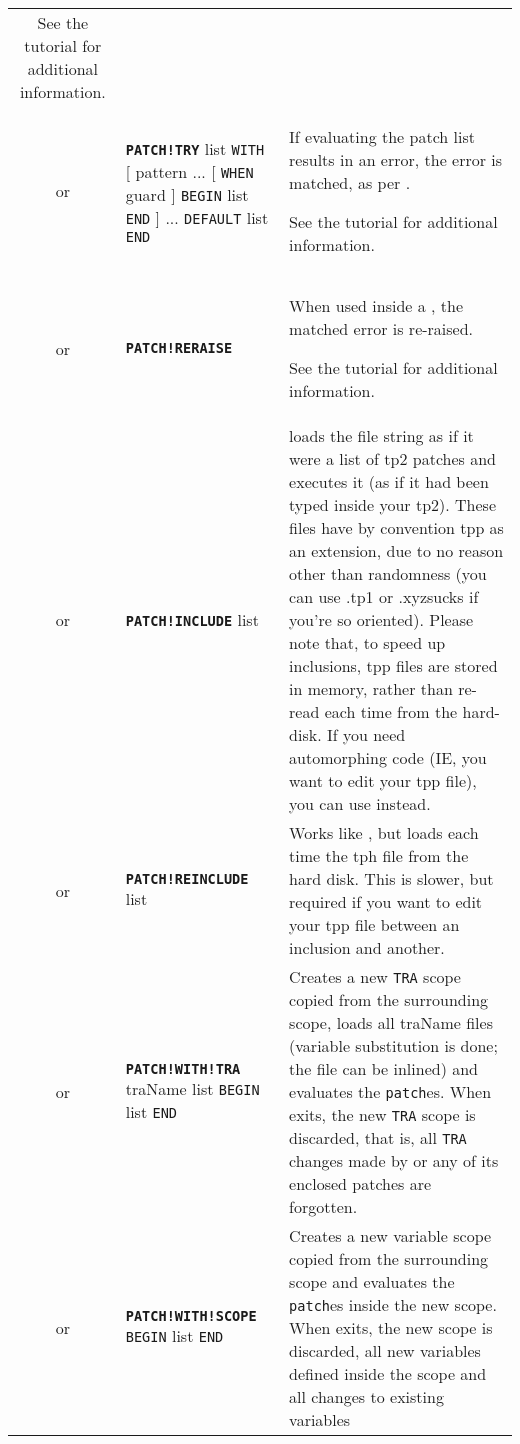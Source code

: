 \documentclass{article}
\def\ttref#1{\ahrefloc{#1}{\tt #1}}
\def\DEFINE#1{{\tt \bf #1}\label{#1}\index{#1}}
\def\t#1{{\tt #1}}
\def\Slist{{\color{red} list }}
\def\Ob{{\color{red} [ }}
\def\Oe{{\color{red} ] }}
\begin{document}
\begin{tabular}{cp{10in}|p{10in}}
    See the \ttref{MATCH and TRY} tutorial for additional information.
  \\
  or & \DEFINE{PATCH!TRY} \ttref{patch} \Slist \t{WITH} \Ob pattern\ttref{value} ...
    \Ob \t{WHEN} guard\ttref{value} \Oe
    \t{BEGIN} \ttref{patch} \Slist \t{END} \Oe
    ... \t{DEFAULT} \ttref{patch} \Slist \t{END} &
    If evaluating the patch list results in an error, the error is matched, as per \ttref{PATCH!MATCH}.

    See the \ttref{MATCH and TRY} tutorial for additional information.
  \\
  or & \DEFINE{PATCH!RERAISE} &
     When used inside a \ttref{PATCH!TRY}, the matched error is re-raised.

     See the \ttref{MATCH and TRY} tutorial for additional information.
  \\
or & \DEFINE{PATCH!INCLUDE} \t{\ttref{String}} \Slist &
    loads the file string as if it were a list of tp2 patches and executes it (as if
		it had been typed inside your tp2).
    These files have by convention tpp as an extension, due to no reason other than
    randomness (you can use .tp1 or .xyzsucks if you're so oriented).
		Please note that, to speed up inclusions, tpp files are stored in memory,
	  rather than re-read each time from the hard-disk. If you need automorphing code
		(IE, you want to edit your tpp file), you can use \ttref{PATCH!REINCLUDE} instead. \\
or & \DEFINE{PATCH!REINCLUDE} \t{\ttref{String}} \Slist &
    Works like \ttref{PATCH!INCLUDE}, but loads each time the tph file from the hard disk.
    This is slower, but required if you want to edit your tpp file between an
    inclusion and another.
    \\
or & \DEFINE{PATCH!WITH!TRA} traName \Slist \t{BEGIN} \ttref{patch} \Slist \t{END} &
    Creates a new \t{TRA} scope copied from the surrounding scope,
    loads all traName files (variable substitution is done; the file
    can be inlined) and evaluates the \t{patch}es. When
    \ttref{PATCH!WITH!TRA} exits, the new \t{TRA} scope is discarded,
    that is, all \t{TRA} changes made by \ttref{PATCH!WITH!TRA} or any
    of its enclosed patches are forgotten. \\
or & \DEFINE{PATCH!WITH!SCOPE} \t{BEGIN} \ttref{patch} \Slist \t{END} &
    Creates a new variable scope copied from the surrounding scope
    and evaluates the \t{patch}es inside the new scope. When
    \ttref{PATCH!WITH!SCOPE} exits, the new scope is discarded, all
    new variables defined inside the scope and all changes to existing variables

\end{tabular}
\end{document}
